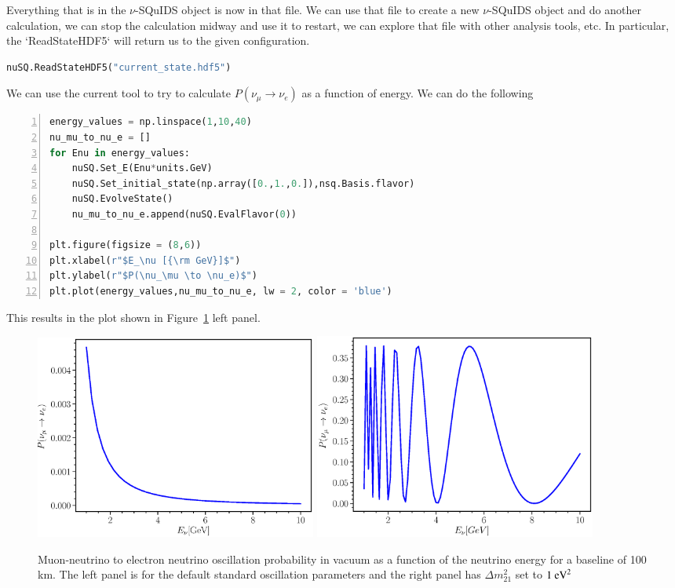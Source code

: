 \documentclass[3p,12pt]{elsarticle}
\begin{document}
Everything that is in the $\nu$-SQuIDS object is now in that file. We can use that file to create a new $\nu$-SQuIDS object and do another calculation, we can stop the calculation midway and use it to restart, we can explore that file with other analysis tools, etc. In particular, the `ReadStateHDF5` will return us to the given configuration.
\begin{lstlisting}[language=Python, breaklines=true]
nuSQ.ReadStateHDF5("current_state.hdf5")
\end{lstlisting}

We can use the current tool to try to calculate $P(\nu_\mu \to \nu_e)$ as a function of energy. We can do the following
\begin{lstlisting}[language=Python, frame=leftline, numbers=left, breaklines=true]
energy_values = np.linspace(1,10,40)
nu_mu_to_nu_e = []
for Enu in energy_values:
    nuSQ.Set_E(Enu*units.GeV)
    nuSQ.Set_initial_state(np.array([0.,1.,0.]),nsq.Basis.flavor)
    nuSQ.EvolveState()
    nu_mu_to_nu_e.append(nuSQ.EvalFlavor(0))

plt.figure(figsize = (8,6))
plt.xlabel(r"$E_\nu [{\rm GeV}]$")
plt.ylabel(r"$P(\nu_\mu \to \nu_e)$")
plt.plot(energy_values,nu_mu_to_nu_e, lw = 2, color = 'blue')
\end{lstlisting}
This results in the plot shown in Figure~\ref{fig:nusquids_python_osc} left panel.
\begin{figure}[h!]
  \label{fig:nusquids_python_osc}
  \centering
  \includegraphics[width=0.45\textwidth]{fig/nusquids_python_osc_std.eps}
  \includegraphics[width=0.45\textwidth]{fig/nusquids_python_osc_nonstd.eps}
  \caption{Muon-neutrino to electron neutrino oscillation probability in vacuum as a function of the neutrino energy for a baseline of 100 km. 
  The left panel is for the default standard oscillation parameters and the right panel has $\Delta m^2_{21}$ set to $1~{\rm eV}^2$}
\end{figure}
\end{document}

